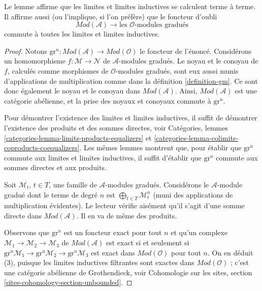 \noindent
Le lemme affirme que les limites et limites inductives se calculent terme à terme. Il
affirme aussi (ou l'implique, si l'on préfère) que le foncteur d'oubli
$$
\textit{Mod}(\mathcal{A})
\longrightarrow
\text{les }\mathcal{O}\text{-modules gradués}
$$
commute à toutes les limites et limites inductives.

\begin{proof}
Notons
$\text{gr}^n : \textit{Mod}(\mathcal{A}) \to \textit{Mod}(\mathcal{O})$ le foncteur
de l'énoncé. Considérons un homomorphisme
$f : \mathcal{M} \to \mathcal{N}$ de
$\mathcal{A}$-modules gradués. Le noyau et le conoyau de
$f$, calculés comme morphismes de $\mathcal{O}$-modules gradués, sont eux
aussi munis d'applications de multiplication comme dans la
définition \ref{definition-gm}. Ce sont donc également
le noyau et le conoyau dans $\textit{Mod}(\mathcal{A})$.
Ainsi, $\textit{Mod}(\mathcal{A})$ est une catégorie abélienne,
et la prise des noyaux et conoyaux commute à $\text{gr}^n$.

\medskip\noindent
Pour démontrer l'existence des limites et limites inductives, il suffit de
démontrer l'existence des produits et des sommes directes, voir
Catégories, lemmes \ref{categories-lemma-limits-products-equalizers} et
\ref{categories-lemma-colimits-coproducts-coequalizers}. Les mêmes
lemmes montrent que, pour
établir que $\text{gr}^n$ commute aux limites et limites inductives, il suffit
d'établir que $\text{gr}^n$ commute aux sommes directes et aux produits.

\medskip\noindent
Soit $\mathcal{M}_t$, $t \in T$, une famille de $\mathcal{A}$-modules gradués.
Considérons le $\mathcal{A}$-module gradué dont le terme de degré $n$ est
$\bigoplus_{t \in T} \mathcal{M}_t^n$ (muni des applications de multiplication évidentes).
Le lecteur vérifie aisément qu'il s'agit d'une somme directe dans
$\textit{Mod}(\mathcal{A})$. Il en va de même des produits.

\medskip\noindent
Observons que $\text{gr}^n$ est un foncteur exact pour tout $n$ et qu'un
complexe $\mathcal{M}_1 \to \mathcal{M}_2 \to \mathcal{M}_3$ de
$\textit{Mod}(\mathcal{A})$ est exact si et seulement si
$\text{gr}^n\mathcal{M}_1 \to \text{gr}^n\mathcal{M}_2 \to
\text{gr}^n\mathcal{M}_3$ est exact dans $\textit{Mod}(\mathcal{O})$ pour
tout $n$. On en déduit (3), puisque les limites inductives filtrantes sont
exactes dans $\textit{Mod}(\mathcal{O})$ ; c'est une
catégorie abélienne de Grothendieck, voir
Cohomologie sur les sites, section \ref{sites-cohomology-section-unbounded}.
\end{proof}






